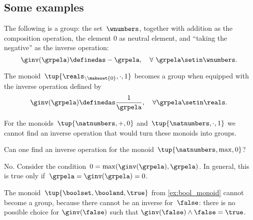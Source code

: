 \subsection{Some examples}

\begin{example}
    The following is a group: the set~$\wnumbers$, together with addition as the composition operation, the element $0$ as neutral element, and ``taking the negative'' as the inverse operation:
    \begin{equation}
        \ginv(\grpela) \definedas -\grpela, \quad \forall \ \grpela \setin \wnumbers.
    \end{equation}
\end{example}
\begin{example}
    The monoid~$\tup{\reals_{\backslash \makeset{0}}, \cdot, 1}$ becomes a group when equipped with the inverse operation defined by
    \begin{equation}
        \ginv(\grpela) \definedas \frac{1}{\grpela}, \quad \forall \grpela \setin \reals.
    \end{equation}
\end{example}

\begin{example}
    For the monoids~$\tup{\natnumbers, +,0}$ and~$\tup{\natnumbers,\cdot,1}$ we cannot find an inverse operation that would turn these monoids into groups.
\end{example}

\begin{exercise}
    Can one find an inverse operation for the monoid~$\tup{\natnumbers,\max,0}$?
\end{exercise}
%
\begin{solution}
    No.
    Consider the condition~$0=\max(\ginv(\grpela),\grpela)$.
    In general, this is true only if~$\grpela=\ginv(\grpela)=0$.
\end{solution}

\begin{example}
    The monoid~$\tup{\boolset,\booland, \true}$ from \cref{ex:bool_monoid} cannot become a group, because there cannot be an inverse for~$\false$: there is no possible choice for $\ginv(\false)$ such that $\ginv(\false)\wedge \false=\true$.
\end{example}

